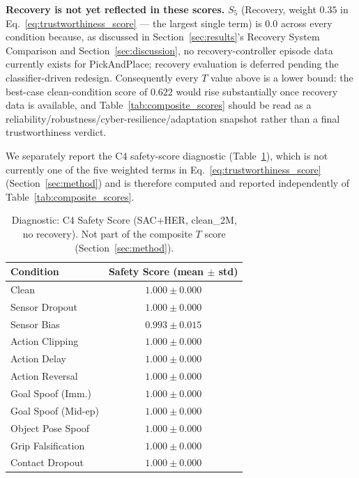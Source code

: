 \documentclass[conference]{IEEEtran}
\begin{document}
\textbf{Recovery is not yet reflected in these scores.} $S_5$ (Recovery, weight $0.35$
in Eq.~\ref{eq:trustworthiness_score} --- the largest single term) is $0.0$ across
every condition because, as discussed in Section~\ref{sec:results}'s Recovery System
Comparison and Section~\ref{sec:discussion}, no recovery-controller episode data
currently exists for PickAndPlace; recovery evaluation is deferred pending the
classifier-driven redesign. Consequently every $T$ value above is a lower bound: the
best-case clean-condition score of $0.622$ would rise substantially once recovery data
is available, and Table~\ref{tab:composite_scores} should be read as a
reliability/robustness/cyber-resilience/adaptation snapshot rather than a final
trustworthiness verdict.

We separately report the C4 safety-score diagnostic (Table~\ref{tab:safety_score_diagnostic}),
which is not currently one of the five weighted terms in
Eq.~\ref{eq:trustworthiness_score} (Section~\ref{sec:method}) and is therefore computed
and reported independently of Table~\ref{tab:composite_scores}.

\begin{table}[t]
\centering
\caption{Diagnostic: C4 Safety Score (SAC+HER, clean\_2M, no recovery). Not part of
the composite $T$ score (Section~\ref{sec:method}).}
\label{tab:safety_score_diagnostic}
\begin{tabular}{lc}
\toprule
\textbf{Condition} & \textbf{Safety Score (mean $\pm$ std)} \\
\midrule
Clean               & $1.000 \pm 0.000$ \\
Sensor Dropout       & $1.000 \pm 0.000$ \\
Sensor Bias          & $0.993 \pm 0.015$ \\
Action Clipping      & $1.000 \pm 0.000$ \\
Action Delay         & $1.000 \pm 0.000$ \\
Action Reversal      & $1.000 \pm 0.000$ \\
Goal Spoof (Imm.)    & $1.000 \pm 0.000$ \\
Goal Spoof (Mid-ep)  & $1.000 \pm 0.000$ \\
Object Pose Spoof    & $1.000 \pm 0.000$ \\
Grip Falsification   & $1.000 \pm 0.000$ \\
Contact Dropout      & $1.000 \pm 0.000$ \\
\bottomrule
\end{tabular}
\end{table}
\end{document}
